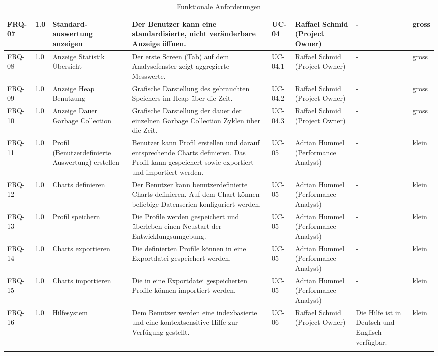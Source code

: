 \begin{landscape}
\begin{longtable}{|p{1.5cm}|p{0.7cm}|p{2.5cm}|p{3.9cm}|p{1.2cm}|p{2.5cm}|p{3.3cm}|p{0.8cm}|}
   FRQ-07 & 1.0 & Standard-auswertung anzeigen & Der Benutzer kann eine standardisierte, nicht veränderbare Anzeige öffnen. & UC-04 & Raffael Schmid (Project Owner) & - & gross \\\hline

   FRQ-08 & 1.0 &  Anzeige Statistik Übersicht & Der erste Screen (Tab) auf dem Analysefenster zeigt aggregierte Messwerte. & UC-04.1 &  Raffael Schmid (Project Owner) & - & gross \\\hline

   FRQ-09 & 1.0 & Anzeige Heap Benutzung  & Grafische Darstellung des gebrauchten Speichers im Heap über die Zeit. & UC-04.2 &Raffael Schmid (Project Owner) & - & gross \\\hline
   FRQ-10 & 1.0 & Anzeige Dauer Garbage Collection  & Grafische Darstellung der dauer der einzelnen Garbage Collection Zyklen über die Zeit. & UC-04.3 & Raffael Schmid (Project Owner) & - & gross \\\hline

   FRQ-11 & 1.0 & Profil (Benutzerdefinierte Auswertung) erstellen & Benutzer kann Profil erstellen und darauf entsprechende Charts definieren. Das Profil kann gespeichert sowie exportiert und importiert werden.& UC-05 & Adrian Hummel (Performance Analyst) & - & klein \\\hline

FRQ-12 & 1.0 & Charts definieren & Der Benutzer kann benutzerdefinierte Charts definieren. Auf dem Chart können beliebige Datenserien konfiguriert werden. & UC-05 & Adrian Hummel (Performance Analyst) & - & klein \\\hline

FRQ-13 & 1.0 & Profil speichern & Die Profile werden gespeichert und überleben einen Neustart der Entwicklungsumgebung. & UC-05 & Adrian Hummel (Performance Analyst) & - & klein \\\hline
FRQ-14 & 1.0 & Charts exportieren & Die definierten Profile können in eine Exportdatei gespeichert werden. & UC-05 & Adrian Hummel (Performance Analyst) & - & klein \\\hline
FRQ-15 & 1.0 & Charts importieren & Die in eine Exportdatei gespeicherten Profile können importiert werden.& UC-05 & Adrian Hummel (Performance Analyst) & - & klein \\\hline


  FRQ-16 & 1.0 & Hilfesystem &  Dem Benutzer werden eine indexbasierte und eine kontextsensitive Hilfe zur Verfügung gestellt. & UC-06 & Raffael Schmid (Project Owner) & Die Hilfe ist in Deutsch und Englisch verfügbar. & klein \\\hline
\caption{Funktionale Anforderungen}
\end{longtable}
\end{landscape}

